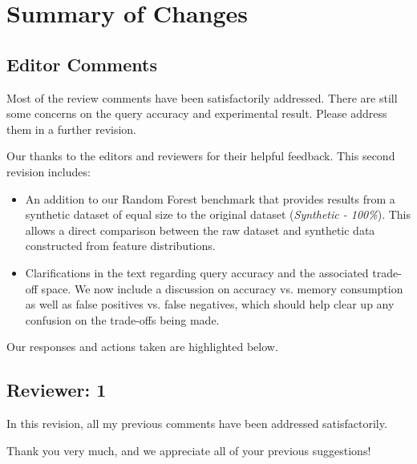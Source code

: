 \documentclass{article}
\begin{document}
\section*{Summary of Changes}\label{summary-of-changes}
\subsection*{Editor Comments}\label{editor-comments}

Most of the review comments have been satisfactorily addressed. There are still some concerns on the query accuracy and experimental result. Please address them in a further revision.

\begin{tcolorbox}
    Our thanks to the editors and reviewers for their helpful feedback. This second revision includes:

\begin{itemize}
    \item An addition to our Random Forest benchmark that provides results from a synthetic dataset of equal size to the original dataset (\emph{Synthetic - 100\%}). This allows a direct comparison between the raw dataset and synthetic data constructed from feature distributions.

    \item Clarifications in the text regarding query accuracy and the associated trade-off space. We now include a discussion on accuracy vs. memory consumption as well as false positives vs. false negatives, which should help clear up any confusion on the trade-offs being made.
\end{itemize}
%
Our responses and actions taken are highlighted below.
\end{tcolorbox}

\vspace{1em}

\subsection*{Reviewer: 1}\label{reviewer-1}

In this revision, all my previous comments have been addressed satisfactorily.

\begin{tcolorbox}
    Thank you very much, and we appreciate all of your previous suggestions!
\end{tcolorbox}

\vspace{1em}
\end{document}
